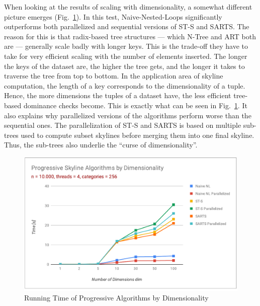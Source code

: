 When looking at the results of scaling with dimensionality, a somewhat different picture emerges (Fig.~\ref{fig:progressive-dim}). In this test, Naive-Nested-Loops significantly outperforms both parallelized and sequential versions of ST-S and SARTS. The reason for this is that radix-based tree structures --- which N-Tree and ART both are --- generally scale badly with longer keys. This is the trade-off they have to take for very efficient scaling with the number of elements inserted. The longer the keys of the dataset are, the higher the tree gets, and the longer it takes to traverse the tree from top to bottom. In the application area of skyline computation, the length of a key corresponds to the dimensionality of a tuple. Hence, the more dimensions the tuples of a dataset have, the less efficient tree-based dominance checks become. This is exactly what can be seen in Fig.~\ref{fig:progressive-dim}. 
It also explains why parallelized versions of the algorithms perform worse than the sequential ones. The parallelization of ST-S and SARTS is based on multiple sub-trees used to compute subset skylines before merging them into one final skyline. Thus, the sub-trees also underlie the ``curse of dimensionality''. 

\begin{figure}[h]
	\centering
	\includegraphics[width=1\linewidth]{figures/progressive-dim}
	\caption{Running Time of Progressive Algorithms by Dimensionality}
	\label{fig:progressive-dim}
\end{figure}

